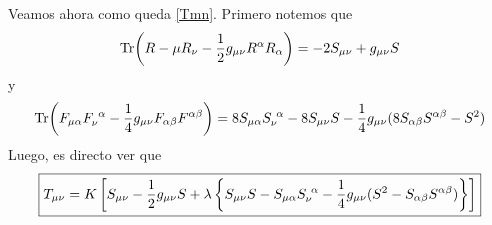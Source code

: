 Veamos ahora como queda \eqref{Tmn}. Primero notemos que
\begin{equation}
  \Tr(R-\mu R_\nu -\frac{1}{2}g_{\mu\nu }R^\alpha R_\alpha )=-2S_{\mu\nu }+g_{\mu\nu }S
\end{equation}
y
\begin{equation}
  \Tr(F_{\mu\alpha }F_\nu ^{~\alpha }-\frac{1}{4}g_{\mu\nu }F_{\alpha\beta }F^{\alpha\beta })=8S_{\mu\alpha }S_\nu ^{~\alpha }-8S_{\mu\nu }S-\frac{1}{4}g_{\mu\nu }(8S_{\alpha\beta }S^{\alpha\beta }-S^2)
\end{equation}
Luego, es directo ver que
\begin{equation}
  \boxed{T_{\mu\nu }=K\left[S_{\mu\nu }-\frac{1}{2}g_{\mu\nu}S+\lambda\left\{S_{\mu\nu}S-S_{\mu\alpha }S_\nu ^{~\alpha }-\frac{1}{4}g_{\mu\nu}(S^2-S_{\alpha\beta}S^{\alpha\beta })\right\}\right]}
\end{equation}






















































